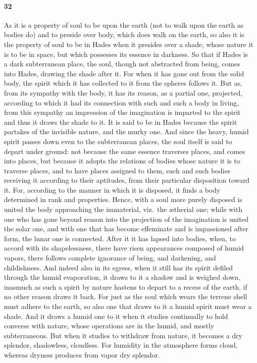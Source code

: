 \documentclass[12pt]{article}
\begin{document}
\paragraph{32} As it is a property of soul to be upon the earth (not to walk
upon the earth as bodies do) and to preside over body, which does walk on the
earth, so also it is the property of soul to be in Hades when it presides over
a shade, whose nature it is to be in space, but which possesses its es\-sence
in darkness. So that if Hades is a dark subterranean place, the soul, though
not abstracted from being, comes into Hades, drawing the shade after it. For
when it has gone out from the solid body, the spirit which it has collected to
it from the spheres follows it. But as, from its sympathy with the body, it has
its reason, as a partial one, projected, according to which it had its
connection with such and such a body in living, from this sympathy an
impression of the imagination is imparted to the spirit and thus it draws the
shade to it. It is said to be in Hades because the spirit partakes of the
invisible nature, and the murky one. And since the heavy, humid spirit passes
down even to the subterranean places, the soul itself is said to depart under
ground: not because the same es\-sence traverses places, and comes into places,
but because it adopts the relations of bodies whose nature it is to traverse
places, and to have places assigned to them, such and such bodies receiving it
according to their aptitudes, from their particular disposition toward it. For,
according to the manner in which it is disposed, it finds a body determined in
rank and properties. Hence, with a soul more purely disposed is united the body
approaching the immaterial, viz.~the {\ae}therial one; while with one who has
gone beyond reason into the projection of the imagination is united the solar
one, and with one that has become effeminate and is impassioned after form, the
lunar one is connected. After it it has lapsed into bodies, when, to accord
with its shapelessness, there have risen appearances composed of humid vapors,
there follows complete ignorance of being, and darkening, and childishness. And
indeed also in its egress, when it still has its spirit defiled through the
humid evaporation, it draws to it a shadow and is weighed down, inasmuch as
such a spirit by nature hastens to depart to a recess of the earth, if no other
reason draws it back. For just as the soul which wears the terrene shell must
adhere to the earth, so also one that draws to it a humid spirit must wear a
shade. And it draws a humid one to it when it studies continually to hold
converse with nature, whose operations are in the humid, and mostly
subterraneous. But when it studies to withdraw from nature, it becomes a dry
splendor, shadowless, cloudless. For humidity in the atmosphere forms cloud,
whereas dryness produces from vapor dry splendor.
\end{document}
